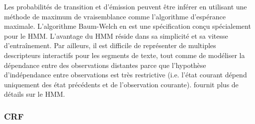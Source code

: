 Les probabilités de transition et d'émission peuvent être inférer en utilisant une méthode de maximum de vraisemblance comme l'algorithme d'espérance maximale. L'algorithme Baum-Welch \citep{welch2003baumwelch} en est une spécification conçu spécialement pour le HMM. L'avantage du HMM réside dans sa simplicité et sa vitesse d'entraînement. Par ailleurs, il est difficile de représenter de multiples descripteurs interactifs pour les segments de texte, tout comme de modéliser la dépendance entre des observations distantes parce que l'hypothèse d'indépendance entre observations est très restrictive (i.e. l'état courant dépend uniquement des état précédents et de l'observation courante). \citet{rabiner1989tutorial} fournit plus de détails sur le HMM.

\subsubsection{CRF}
\label{sec:structuration:biblio:CRF}


